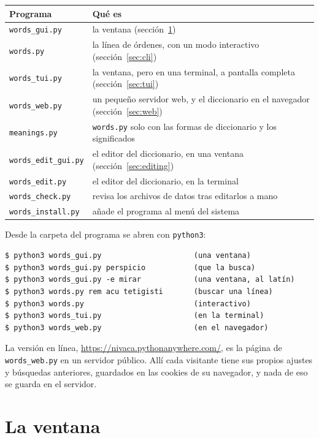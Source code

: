 \documentclass[12pt,
              article,
              oneside
              ]{memoir}
\begin{document}
\begin{longtable}{@{}lp{}@{}}
\toprule
Programa & Qué es\\
\midrule
\endhead
\texttt{words\_gui.py} & la ventana (sección~\ref{sec:window})\\
\texttt{words.py} & la línea de órdenes, con un modo interactivo (sección~\ref{sec:cli})\\
\texttt{words\_tui.py} & la ventana, pero en una terminal, a pantalla completa (sección~\ref{sec:tui})\\
\texttt{words\_web.py} & un pequeño servidor web, y el diccionario en el navegador (sección~\ref{sec:web})\\
\texttt{meanings.py} & \texttt{words.py} solo con las formas de diccionario y los significados\\
\texttt{words\_edit\_gui.py} & el editor del diccionario, en una ventana (sección~\ref{sec:editing})\\
\texttt{words\_edit.py} & el editor del diccionario, en la terminal\\
\texttt{words\_check.py} & revisa los archivos de datos tras editarlos a mano\\
\texttt{words\_install.py} & añade el programa al menú del sistema\\
\bottomrule
\end{longtable}

\noindent
Desde la carpeta del programa se abren con \texttt{python3}:

\begin{verbatim}
$ python3 words_gui.py                     (una ventana)
$ python3 words_gui.py perspicio           (que la busca)
$ python3 words_gui.py -e mirar            (una ventana, al latín)
$ python3 words.py rem acu tetigisti       (buscar una línea)
$ python3 words.py                         (interactivo)
$ python3 words_tui.py                     (en la terminal)
$ python3 words_web.py                     (en el navegador)
\end{verbatim}

\noindent{}%
La versión en línea, \url{https://nivaca.pythonanywhere.com/}, es la
página de \texttt{words\_web.py} en un servidor público. Allí cada
visitante tiene sus propios ajustes y búsquedas anteriores, guardados en
las cookies de su navegador, y nada de eso se guarda en el servidor.

\section{La ventana}
\label{sec:window}
\end{document}

